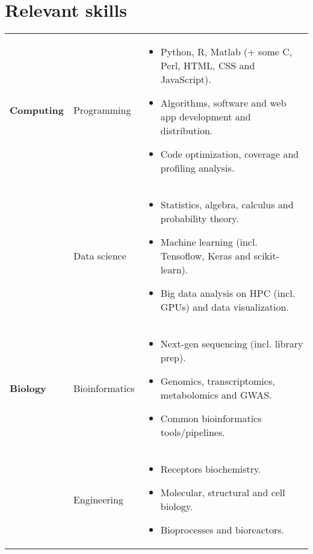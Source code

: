 \documentclass{CV}
\begin{document}
\section*{Relevant skills}
\begin{tabular}{p{} p{} p{}}
\textbf{Computing} & 
	Programming &
		\begin{itemize}\setlength\itemsep{-0.5em}
		\vspace{-1.8em}
		\item Python, R, Matlab (+ some C, Perl, HTML, CSS and JavaScript).
		\item Algorithms, software and web app development and distribution.
		\item Code optimization, coverage and profiling analysis.
		\end{itemize}\\
& 
	Data science &
		\begin{itemize}\setlength\itemsep{-0.5em}
		\vspace{-1.8em}
		\item Statistics, algebra, calculus and probability theory.
		\item Machine learning (incl. Tensoflow, Keras and scikit-learn).
		\item Big data analysis on HPC (incl. GPUs) and data visualization.
		\end{itemize}\\
		
\textbf{Biology} & 
	Bioinformatics &
		\begin{itemize}\setlength\itemsep{-0.5em}
		\vspace{-1.8em}
		\item Next-gen sequencing (incl. library prep).
		\item Genomics, transcriptomics, metabolomics and GWAS.
		\item Common bioinformatics tools/pipelines.
		\end{itemize}\\
& 
	Engineering &
		\begin{itemize}\setlength\itemsep{-0.5em}
		\vspace{-1.8em}
		\item Receptors biochemistry.
		\item Molecular, structural and cell biology.
		\item Bioprocesses and bioreactors.
		\end{itemize}\\
		

\end{tabular}
\end{document}
